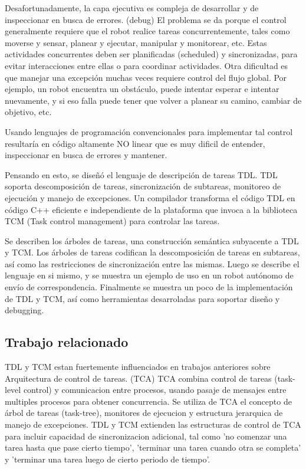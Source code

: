 \documentclass[a4paper, 11pt, oneside]{article}
\begin{document}
Desafortunadamente, la capa ejecutiva es compleja de desarrollar y de
inspeccionar en busca de errores. (debug)
El problema se da porque el control generalmente requiere que el robot
realice tareas concurrentemente, tales como moverse y sensar,
planear y ejecutar, manipular y monitorear, etc.
Estas actividades concurrentes deben ser planificadas (scheduled) y
sincronizadas, para evitar interacciones entre ellas o para
coordinar actividades.
Otra dificultad es que manejar una excepción muchas veces requiere control
del flujo global.
Por ejemplo, un robot encuentra un obstáculo, puede intentar esperar e
intentar nuevamente, y si eso falla puede tener que volver a 
planear su camino, cambiar de objetivo, etc.

Usando lenguajes de programación convencionales para implementar tal control
resultaría en código altamente NO linear que es muy 
dificil de entender, inspeccionar en busca de errores y mantener.

Pensando en esto, se diseñó el lenguaje de descripción de tareas TDL.
TDL soporta descomposición de tareas, sincronización de subtareas, monitoreo
de ejecución y manejo de excepciones.
Un compilador transforma el código TDL en código C++ eficiente e independiente
de la plataforma que invoca a la biblioteca TCM (Task control management)
para controlar las tareas.

Se describen los árboles de tareas, una construcción semántica subyacente a
TDL y TCM. 
Los árboles de tareas codifican la descomposición de tareas en subtareas, así
como las restricciones de sincronización entre las mismas.
Luego se describe el lenguaje en si mismo, y se muestra un ejemplo de uso en
un robot autónomo de envío de correspondencia.
Finalmente se muestra un poco de la implementación de TDL y TCM, así como
herramientas desarroladas para soportar diseño y debugging.


\subsection{Trabajo relacionado}

TDL y TCM estan fuertemente influenciados en trabajos anteriores sobre
 Arquitectura de control de tareas. (TCA)
TCA combina control de tareas (task-level control) y comunicacion entre
 procesos, usando pasaje de mensajes entre multiples procesos
para obtener concurrencia. 
Se utiliza de TCA el concepto de árbol de tareas (task-tree), monitores de 
ejecucion y estructura jerarquica de manejo de excepciones.
TDL y TCM extienden las estructuras de control de TCA para incluir 
capacidad de sincronizacion adicional, tal como 'no comenzar una tarea hasta 
que pase cierto tiempo', 'terminar una tarea cuando otra se completa' y 
'terminar una tarea luego de cierto periodo de tiempo'.
\end{document}
